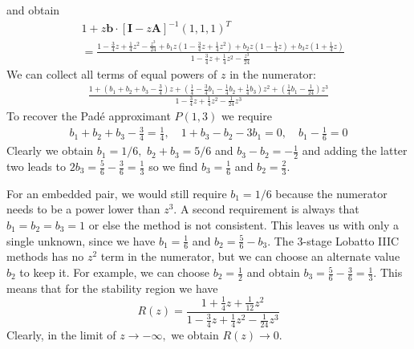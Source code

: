 \documentclass[10pt,a4paper]{article}
\newcommand{\half}[0]{\frac{1}{2}}
\newcommand{\bvec}[1]{\mathbf{#1}}
\begin{document}
and obtain
\begin{align*}
  &1 + z \bvec{b}\cdot[\bvec{I}-z\bvec{A}]^{-1}(1,1,1)^T \\
  &= \frac{1 - \frac{3}{4}z + \frac{1}{4}z^2 - \frac{z^3}{24} + b_1z(1 - \frac{3}{4}z + \frac{1}{4}z^2) + b_2z(1 - \frac{1}{4}z) + b_3z(1 + \frac{1}{4}z)}{1 - \frac{3}{4}z + \frac{1}{4}z^2 - \frac{z^3}{24}}
\end{align*}
We can collect all terms of equal powers of $z$ in the numerator:
\begin{align*}
  \frac{1 + \left(b_1 + b_2 + b_3 - \frac{3}{4}\right)z + \left(\frac{1}{4} - \frac{3}{4}b_1 - \frac{1}{4}b_2 + \frac{1}{4}b_3 \right)z^2 + \left(\frac{1}{4}b_1 - \frac{1}{24}\right)z^3}{1 - \frac{3}{4}z + \frac{1}{4}z^2 - \frac{1}{24}z^3}
\end{align*}
To recover the Pad\'{e} approximant $P(1, 3)$ we require
\begin{align*}
  b_1+b_2+b_3 - \frac{3}{4} = \frac{1}{4}, \quad 1 + b_3 - b_2 - 3b_1 = 0, \quad b_1 - \frac{1}{6} = 0
\end{align*}
Clearly we obtain $b_1 = 1/6,$ $b_2+b_3 = 5/6$ and $b_3-b_2 = -\frac{1}{2}$ and adding the latter two leads to $2b_3 = \frac{5}{6} - \frac{3}{6} = \frac{1}{3}$ so we find $b_3 = \frac{1}{6}$ and $b_2=\frac{2}{3}.$

For an embedded pair, we would still require $b_1=1/6$ because the numerator needs to be a power lower than $z^3.$ A second requirement is always that $b_1=b_2=b_3=1$ or else the method is not consistent.
This leaves us with only a single unknown, since we have $b_1 = \frac{1}{6}$ and $b_2 = \frac{5}{6} - b_3.$ The 3-stage Lobatto IIIC methods has no $z^2$ term in the numerator, but we can choose an alternate value $b_2$ to keep it.
For example, we can choose $b_2=\half$ and obtain $b_3 = \frac{5}{6} - \frac{3}{6} = \frac{1}{3}.$
This means that for the stability region we have
\begin{equation*}
  R(z) = \frac{1 + \frac{1}{4}z + \frac{1}{12}z^2}{1 - \frac{3}{4}z + \frac{1}{4}z^2 - \frac{1}{24}z^3}
\end{equation*}
Clearly, in the limit of $z\rightarrow -\infty,$ we obtain $R(z) \rightarrow 0.$
\end{document}
